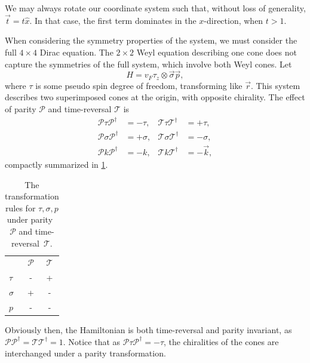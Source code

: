 \begin{Proof}
  We may always rotate our coordinate system such that, without loss of generality, \(\vec{t} = t \hat{x}\).
  In that case, the first term dominates in the \(x\)-direction, when $t>1$.
\end{Proof}


When considering the symmetry properties of the system, we must consider the full \( 4\times 4 \) Dirac equation.
The \( 2\times 2 \) Weyl equation describing one cone does not capture the symmetries of the full system, which involve both Weyl cones.
Let
\[
  H = v_{F} \tau _{z} \otimes \vec{\sigma} \vec{p},
\]
where \(\tau \) is some pseudo spin degree of freedom, transforming like \(\vec{r}\).
This system describes two superimposed cones at the origin, with opposite chirality.
The effect of parity \(\mathcal{P}\) and time-reversal \(\mathcal{T}\) is
\begin{equation}
  \label{eq:135}
  \begin{aligned}
    \mathcal{P} \tau \mathcal{P}^{\dagger} &= -\tau, & \mathcal{T} \tau \mathcal{T}^{\dagger} &= +\tau,\\
    \mathcal{P} \sigma  \mathcal{P}^{\dagger} &= + \sigma,  & \mathcal{T} \sigma  \mathcal{T}^{\dagger} &= -\sigma, \\
    \mathcal{P} k \mathcal{P}^{\dagger} &= -k, & \mathcal{T} k \mathcal{T}^{\dagger} &= -\vec{k},
  \end{aligned}
\end{equation}
compactly summarized in \cref{tab:sign-transform}.
\begin{table}[h]
  \centering
  \caption{The transformation rules for \( \tau, \sigma, p \) under parity~\( \mathcal{P} \) and time-reversal~\( \mathcal{T} \).%
   \label{tab:sign-transform}}
  \begin{tabular}{lcc}
    \toprule
    & \(\mathcal{P}\) & \(\mathcal{T}\)\\
    \cmidrule{2-3}
    \(\tau \) & - & +\\
    \(\sigma \) & + & -\\
    \(p\) & - & -\\
    \bottomrule
  \end{tabular}
\end{table}
Obviously then, the Hamiltonian is both time-reversal and parity invariant, as \(\mathcal{P} \mathcal{P}^{\dagger} = \mathcal{T} \mathcal{T}^{\dagger} = 1\).
Notice that as \( \mathcal{P} \tau \mathcal{P}^{\dagger} = - \tau \), the chiralities of the cones are interchanged under a parity transformation.

